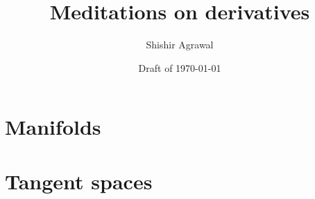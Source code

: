 \documentclass[letterpaper]{scrbook}
\title{Meditations on derivatives}
\author{Shishir Agrawal}
\date{Draft of \today}
\numberwithin{equation}{chapter}
\theoremstyle{definition}
\begin{document}
	\maketitle
	\tableofcontents
	
	
	
	
	
	
	
	\chapter{Manifolds}
	
	\chapter{Tangent spaces}
	
	
	
	
	
\end{document}
